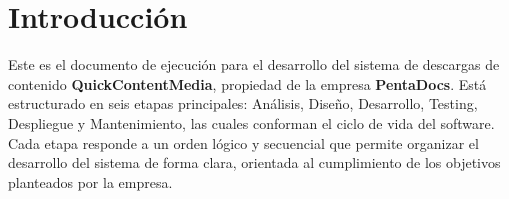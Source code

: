 \chapter{Introducción}
Este es el documento de ejecución para el desarrollo del sistema de descargas de contenido \textbf{QuickContentMedia}, propiedad de la empresa \textbf{PentaDocs}. Está estructurado en seis etapas principales: Análisis, Diseño, Desarrollo, Testing, Despliegue y Mantenimiento, las cuales conforman el ciclo de vida del software. Cada etapa responde a un orden lógico y secuencial que permite organizar el desarrollo del sistema de forma clara, orientada al cumplimiento de los objetivos planteados por la empresa.